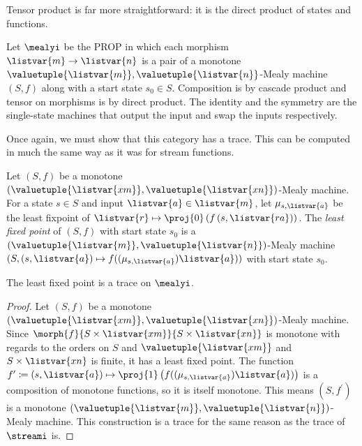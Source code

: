 Tensor product is far more straightforward: it is the direct product of states
and functions.

\begin{definition}
    Let \(\mealyi\) be the PROP in which each morphism
    \(\listvar{m} \to \listvar{n}\) is a pair of a monotone
    \(\valuetuple{\listvar{m}}, \valuetuple{\listvar{n}}\)-Mealy machine
    \((S, f)\) along with a start state \(s_0 \in S\).
    Composition is by cascade product and tensor on morphisms is by
    direct product.
    The identity and the symmetry are the single-state machines that output the
    input and swap the inputs respectively.
\end{definition}

Once again, we must show that this category has a trace.
This can be computed in much the same way as it was for stream functions.

\begin{definition}
    Let \((S, f)\) be a monotone \(
        (\valuetuple{\listvar{xm}}, \valuetuple{\listvar{xn}})
    \)-Mealy machine.
    For a state \(s \in S\) and input \(\listvar{a} \in \listvar{m}\), let
    \(\mu_{s,\listvar{a}}\) be the least fixpoint of \(
        \listvar{r} \mapsto \proj{0}\left(f\left(s, \listvar{ra}\right)\right)
    \).
    The \emph{least fixed point} of \((S, f)\) with start state \(s_0\) is a \(
        (\valuetuple{\listvar{m}}, \valuetuple{\listvar{n}})
    \)-Mealy machine \(
        (S, (s, \listvar{a}) \mapsto f((\mu_{s,\listvar{a}})\listvar{a}))
    \) with start state \(s_0\).
\end{definition}

\begin{proposition}
    The least fixed point is a trace on \(\mealyi\).
\end{proposition}
\begin{proof}
    Let \((S, f)\) be a monotone
    \((\valuetuple{\listvar{xm}}, \valuetuple{\listvar{xn}})\)-Mealy machine.
    Since \(\morph{f}{S \times \listvar{xm}}{S \times \listvar{xn}}\) is
    monotone with regards to the orders on \(S\) and
    \(\valuetuple{\listvar{xm}}\) and \(S \times \listvar{xn}\) is finite, it
    has a least fixed point.
    The function \(
        f^\prime \coloneqq (s, \listvar{a})
        \mapsto
        \proj{1}\left(f((\mu_{s,\listvar{a}})\listvar{a})\right)
    \) is a composition of monotone functions, so it is itself monotone.
    This means \((S, f^\prime)\) is a monotone \(
        (\valuetuple{\listvar{m}}, \valuetuple{\listvar{n}})
    \)-Mealy machine.
    This construction is a trace for the same reason as the trace of
    \(\streami\) is.
\end{proof}

